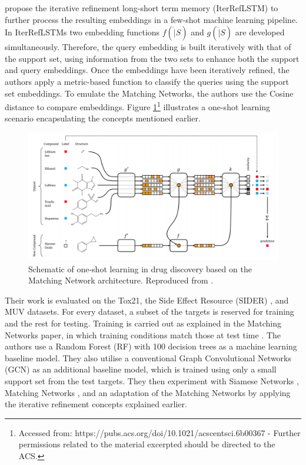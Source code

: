 \citet{altae2017low} propose the iterative refinement long-short term memory (IterRefLSTM) to further process the resulting embeddings in a few-shot machine learning pipeline. In IterRefLSTMs two embedding functions $f(\dot|S)$ and $g(\dot|S)$ are developed simultaneously. Therefore, the query embedding is built iteratively with that of the support set, using information from the two sets to enhance both the support and query embeddings. Once the embeddings have been iteratively refined, the authors apply a metric-based function to classify the queries using the support set embeddings. To emulate the Matching Networks, the authors use the Cosine distance to compare embeddings. Figure \ref{fig:schematiconeshotdrug}\footnote{Accessed from: https://pubs.acs.org/doi/10.1021/acscentsci.6b00367 - Further permissions related to the material excerpted should be directed to the ACS.} illustrates a one-shot learning scenario encapsulating the concepts mentioned earlier.

\begin{figure}[h]
    \centering
    \includegraphics[width=0.9\linewidth]{img/pandeschematic.png}
    \caption[Schematic of one-shot learning in drug discovery]{Schematic of one-shot learning in drug discovery based on the Matching Network \citep{vinyals2016matching} architecture. Reproduced from \citet{altae2017low}.}
    \label{fig:schematiconeshotdrug}
\end{figure}

Their work is evaluated on the Tox21, the Side Effect Resource (SIDER) \citep{kuhn2016sider}, and MUV datasets\citep{rohrer2009maximum}. For every dataset, a subset of the targets is reserved for training and the rest for testing. Training is carried out as explained in the Matching Networks paper, in which training conditions match those at test time \citep{vinyals2016matching}. The authors use a Random Forest (RF) with 100 decision trees as a machine learning baseline model. They also utilise a conventional Graph Convolutional Networks (GCN) \citep{kipf2016semi} as an additional baseline model, which is trained using only a small support set from the test targets. They then experiment with Siamese Networks \citep{koch2015siamese}, Matching Networks \citep{vinyals2016matching}, and an adaptation of the Matching Networks by applying the iterative refinement concepts explained earlier.

